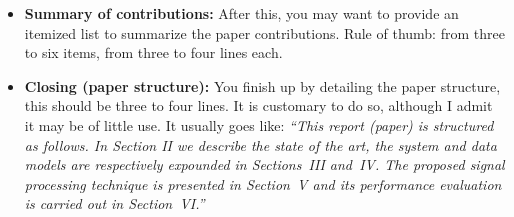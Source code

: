 {\begin{itemize}
\begin{enumerate}
 \end{enumerate}
\item \textbf{Summary of contributions:} After this, you may want to provide an itemized list to summarize the paper contributions. Rule of thumb: from three to six items, from three to four lines each.
\item \textbf{Closing (paper structure):} You finish up by detailing the paper structure, this should be three to four lines. It is customary to do so, although I admit it may be of little use. It usually goes like: {\it ``This report (paper) is structured as follows. In Section II we describe the state of the art, the system and data models are respectively expounded in Sections~III and~IV. The proposed signal processing technique is presented in Section~V and its performance evaluation is carried out in Section~VI.''}\\
\end{itemize}}

